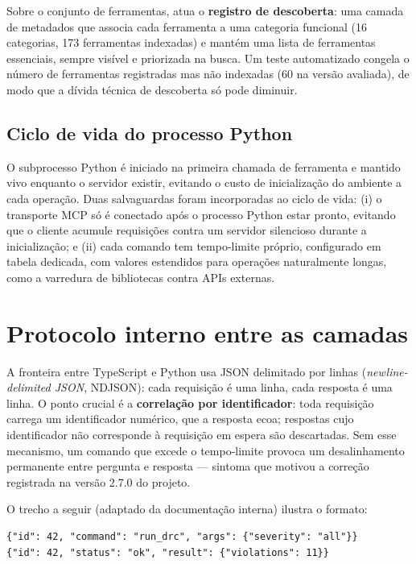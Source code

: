 Sobre o conjunto de ferramentas, atua o \textbf{registro de descoberta}: uma
camada de metadados que associa cada ferramenta a uma categoria funcional
(16 categorias, 173 ferramentas indexadas) e mantém uma lista de ferramentas
essenciais, sempre visível e priorizada na busca. Um teste automatizado
congela o número de ferramentas registradas mas não indexadas (60 na versão
avaliada), de modo que a dívida técnica de descoberta só pode diminuir.

\subsection{Ciclo de vida do processo Python}

O subprocesso Python é iniciado na primeira chamada de ferramenta e mantido
vivo enquanto o servidor existir, evitando o custo de inicialização do
ambiente a cada operação. Duas salvaguardas foram incorporadas ao ciclo de
vida: (i) o transporte MCP só é conectado após o processo Python estar pronto,
evitando que o cliente acumule requisições contra um servidor silencioso
durante a inicialização; e (ii) cada comando tem tempo-limite próprio,
configurado em tabela dedicada, com valores estendidos para operações
naturalmente longas, como a varredura de bibliotecas contra APIs externas.

\section{Protocolo interno entre as camadas}

A fronteira entre TypeScript e Python usa JSON delimitado por linhas
(\emph{newline-delimited JSON}, NDJSON): cada requisição é uma linha, cada
resposta é uma linha. O ponto crucial é a \textbf{correlação por
identificador}: toda requisição carrega um identificador numérico, que a
resposta ecoa; respostas cujo identificador não corresponde à requisição em
espera são descartadas. Sem esse mecanismo, um comando que excede o
tempo-limite provoca um desalinhamento permanente entre pergunta e resposta
--- sintoma que motivou a correção registrada na versão 2.7.0 do projeto.

O trecho a seguir (adaptado da documentação interna) ilustra o formato:

\begin{verbatim}
{"id": 42, "command": "run_drc", "args": {"severity": "all"}}
{"id": 42, "status": "ok", "result": {"violations": 11}}
\end{verbatim}

